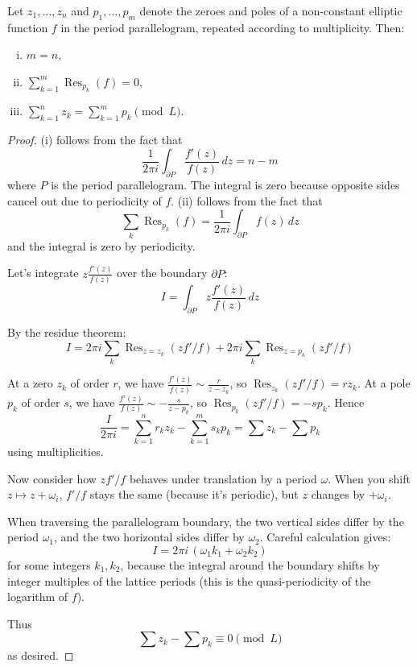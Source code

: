 \documentclass[12pt]{article}
\begin{document}
\begin{theorem}
Let $z_1, \dots, z_n$ and $p_1, \dots, p_m$ denote the zeroes and poles of a non-constant elliptic function $f$ in the period parallelogram, repeated according to multiplicity. Then:
\begin{enumerate}[(i)]
    \item $m = n$,
    \item $\displaystyle \sum_{k=1}^m \operatorname{Res}_{p_k}(f) = 0,$
    \item $\displaystyle \sum_{k=1}^n z_k = \sum_{k=1}^m p_k \pmod{L}.$
\end{enumerate}
\end{theorem}

\begin{proof}
    (i) follows from the fact that
    \[\frac{1}{2\pi i}\int_{\partial P} \frac{f'(z)}{f(z)}\,dz = n - m\] where $P$ is the period parallelogram. The integral is zero because opposite sides cancel out due to periodicity of $f$.
    (ii) follows from the fact that
    \[\sum_k \operatorname{Res}_{p_k}(f) = \frac{1}{2\pi i} \int_{\partial P} f(z)\,dz\] and the integral is zero by periodicity.

Let's integrate $z\frac{f'(z)}{f(z)}$ over the boundary $\partial P$:
\[
I = \int_{\partial P} z\frac{f'(z)}{f(z)}\,dz
\]

By the residue theorem:
\[
I = 2\pi i\sum_{k} \operatorname{Res}_{z=z_k}(z f'/f) + 2\pi i\sum_{k} \operatorname{Res}_{z=p_k}(z f'/f)
\]

At a zero $z_k$ of order $r$, we have $\frac{f'(z)}{f(z)} \sim \frac{r}{z-z_k}$, so $\operatorname{Res}_{z_k}(z f'/f) = r z_k$. At a pole $p_k$ of order $s$, we have $\frac{f'(z)}{f(z)} \sim -\frac{s}{z-p_k}$, so $\operatorname{Res}_{p_k}(z f'/f) = -s p_k$. Hence
\[
\frac{I}{2\pi i} = \sum_{k=1}^n r_k z_k - \sum_{k=1}^m s_k p_k = \sum z_k - \sum p_k
\]
using multiplicities.

Now consider how $z f'/f$ behaves under translation by a period $\omega$. When you shift $z \mapsto z+\omega_i$, $f'/f$ stays the same (because it's periodic), but $z$ changes by $+\omega_i$.

When traversing the parallelogram boundary, the two vertical sides differ by the period $\omega_1$, and the two horizontal sides differ by $\omega_2$. Careful calculation gives:
\[
I = 2\pi i\,(\omega_1 k_1 + \omega_2 k_2)
\]
for some integers $k_1,k_2$, because the integral around the boundary shifts by integer multiples of the lattice periods (this is the quasi-periodicity of the logarithm of $f$).

Thus
\[
\sum z_k - \sum p_k \equiv 0 \pmod{L}
\]
as desired.
\end{proof}
\end{document}
